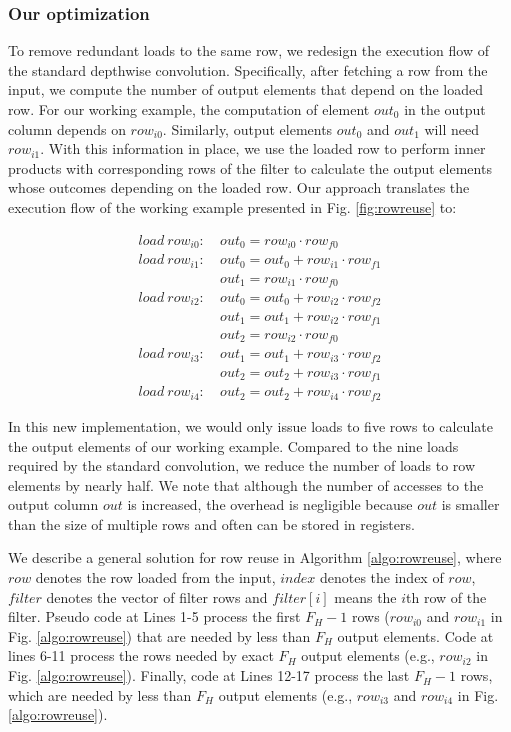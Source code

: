 \subsubsection{Our optimization}
To remove redundant loads to the same row, we redesign the execution flow of the standard depthwise convolution. Specifically, after
fetching a row from the input, we compute the number of output elements that depend on the loaded row. For our working example, the
computation of element $out_0$ in the output column depends on $row_{i0}$. Similarly, output elements $out_0$ and $out_1$ will need
$row_{i1}$. With this information in place, we use the loaded row to perform inner products with corresponding rows of the filter to
calculate the output elements whose outcomes depending on the loaded row. Our approach translates the execution flow of the working example
presented in Fig. \ref {fig:rowreuse} to:

\begin{equation}\nonumber
\begin{aligned}
load\ row_{i0}:
&\ out_0=row_{i0} \cdot row_{f0} \\
load\ row_{i1}:
&\ out_0 = out_0+row_{i1} \cdot row_{f1}\\
&\ out_1=row_{i1} \cdot row_{f0}\\
load\ row_{i2}:
&\ out_0 = out_0+row_{i2} \cdot row_{f2}\\
&\ out_1 = out_1+row_{i2} \cdot row_{f1}\\
&\ out_{2}=row_{i2} \cdot row_{f0}\\
load\ row_{i3}:
&\ out_1=out_1+row_{i3} \cdot row_{f2} \\
&\ out_2=out_2+row_{i3} \cdot row_{f1}\\
load\ row_{i4}:
&\ out_2=out_2+row_{i4} \cdot row_{f2}
\end{aligned}	
\end{equation}

In this new implementation, we would only issue loads to five rows to calculate the output elements of our working example. Compared to the
nine loads required by the standard convolution, we reduce the number of loads to row elements by nearly half. We note that although the
number of accesses to the output column $out$ is increased, the overhead is negligible because $out$ is smaller than the size of multiple
rows and often can be stored in registers.

We describe a general solution for row reuse in Algorithm \ref{algo:rowreuse}, where $row$ denotes the row loaded from the input, $index$ denotes the index of $row$, $filter$ denotes the vector of filter rows and $filter[i]$ means the $i$th row of the filter.
Pseudo code at Lines 1-5 process the first $F_H-1$ rows ($row_{i0}$ and $row_{i1}$ in Fig. \ref{algo:rowreuse}) that are needed by less than $F_H$ output elements.
Code at lines 6-11 process the rows needed by exact $F_H$ output elements (e.g., $row_{i2}$ in Fig. \ref{algo:rowreuse}).
Finally, code at Lines 12-17 process the last $F_H-1$ rows, which are needed by less than $F_H$ output elements (e.g., $row_{i3}$ and $row_{i4}$ in Fig. \ref{algo:rowreuse}).

